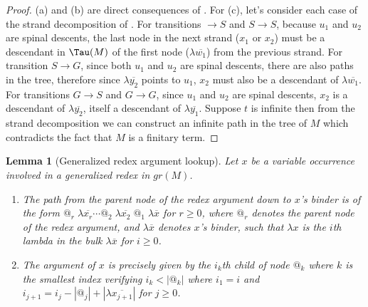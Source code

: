 \documentclass[xchauthor,chkrefs,GCNS,amsmath,amsthm,rotating,leaveRGB]{tcsg}
\theoremstyle{plain}
\newtheorem{lemma}[theorem]{Lemma}
\theoremstyle{definition}
\newcommand{\ctree}{\Tau}
\begin{document}
\begin{proof}
(a) and (b) are direct consequences of
. For (c), let's
consider each case of the strand decomposition of
. For transitions
$\rightarrow S$ and $S \rightarrow S$, because $u_{1}$ and $u_{2}$ are spinal
descents, the last node in the next strand ($x_{1}$ or $x_{2}$) must be a
descendant in $\ctree (M)$ of the first node ($\lambda \overline{w_{1}}$)
from the previous strand. For transition $S\rightarrow G$, since both $u_{1}$
and $u_{2}$ are spinal descents, there are also paths in the tree, therefore
since $\lambda \overline{y_{2}}$ points to $u_{1}$, $x_{2}$ must also be a
descendant of $\lambda \overline{w_{1}}$. For transitions $G \rightarrow S$
and $G \rightarrow G$, since $u_{1}$ and $u_{2}$ are spinal descents, $x_{2}$
is a descendant of $\lambda \overline{y_{2}}$, itself a descendant of
$\lambda \overline{y_{1}}$. Suppose $t$ is infinite then from the strand
decomposition we can construct an infinite path in the tree of $M$ which
contradicts the fact that $M$ is a finitary term.
\end{proof}


\begin{lemma}[Generalized redex argument lookup]\label{lemma:genredex_lookup}
Let $x$ be a variable occurrence involved in a generalized redex in $gr(M)$.
%
\begin{enumerate}[\textit{(ii)}]
\item[\textit{(i)}] The path from the parent node of the redex argument down to
    $x$'s binder is of the form $ @_{r} \; \lambda \overline{x_{r}} \cdots
    @_{2} \; \lambda \overline{x_{2}} \; @_{1} \; \lambda \overline{x}$ for
    $r\geq 0$, where $@_{r}$ denotes the parent node of the redex argument,
    and $\lambda \overline{x}$ denotes $x$'s binder, such that $\lambda x$
    is the $i$th lambda in the bulk $\lambda \overline{x}$ for $i\geq 0$.

\item[\textit{(ii)}] The argument of $x$ is precisely given by the $i_{k}$th child
    of node $@_{k}$ where $k$ is the smallest index verifying
    $i_{k}<|@_{k}|$ where $i_{1} = i$ and $i_{j+1} = i_{j} - |@_{j}| +
    |\lambda \overline{x_{j+1}}|$ for $j\geq 0$.
\end{enumerate}
\end{lemma}
\end{document}
